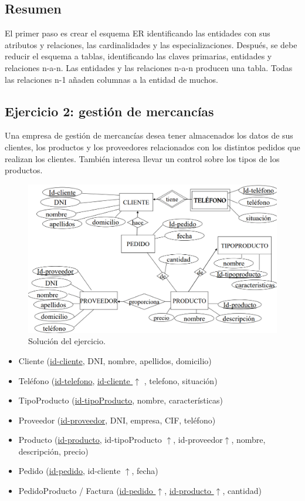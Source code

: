 \subsection{Resumen}
El primer paso es crear el esquema ER identificando las entidades con sus atributos y relaciones, las cardinalidades y las especializaciones. Después, se debe reducir el esquema a tablas, identificando las claves primarias, entidades y relaciones n-a-n. Las entidades y las relaciones n-a-n producen una tabla. Todas las relaciones n-1 añaden columnas a la entidad de muchos.

\subsection{Ejercicio 2: gestión de mercancías}
Una empresa de gestión de mercancías desea tener almacenados los datos de sus clientes, los productos y los proveedores relacionados con los distintos pedidos que realizan los clientes. También interesa llevar un control sobre los tipos de los productos.

\begin{figure}[htbp]
\centering
\includegraphics[width=0.7\linewidth]{figs/ejercicio-2-solucion.png}
\caption{Solución del ejercicio.}
\end{figure}

\begin{itemize}
\item Cliente (\underline{id-cliente}, DNI, nombre, apellidos, domicilio)
\item Teléfono (\underline{id-telefono}, \underline{id-cliente $\uparrow$} , telefono, situación)
\item TipoProducto (\underline{id-tipoProducto}, nombre, características)
\item Proveedor (\underline{id-proveedor}, DNI, empresa, CIF, teléfono)
\item Producto (\underline{id-producto}, id-tipoProducto $\uparrow$, id-proveedor$ \uparrow$, nombre, descripción, precio)
\item Pedido (\underline{id-pedido}, id-cliente $\uparrow$, fecha)
\item PedidoProducto / Factura (\underline{id-pedido $\uparrow$}, \underline{id-producto $\uparrow$}, cantidad) 
\end{itemize}